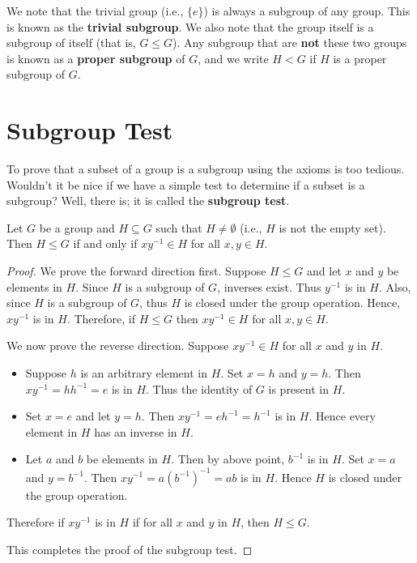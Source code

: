 We note that the trivial group (i.e., $\{e\}$) is always a subgroup of any group. This is known as the \textbf{trivial subgroup}. We also note that the group itself is a subgroup of itself (that is, $G \leq G$). Any subgroup that are \textbf{not} these two groups is known as a \textbf{proper subgroup} of $G$, and we write $H < G$ if $H$ is a proper subgroup of $G$.

\section{Subgroup Test}
To prove that a subset of a group is a subgroup using the axioms is too tedious. Wouldn't it be nice if we have a simple test to determine if a subset is a subgroup? Well, there is; it is called the \textbf{subgroup test}.
\begin{theorem}
    Let $G$ be a group and $H \subseteq G$ such that $H \neq \emptyset$ (i.e., $H$ is not the empty set). Then $H \leq G$ if and only if $xy^{-1} \in H$ for all $x, y \in H$.
\end{theorem}
\begin{proof}
    We prove the forward direction first. Suppose $H \leq G$ and let $x$ and $y$ be elements in $H$. Since $H$ is a subgroup of $G$, inverses exist. Thus $y^{-1}$ is in $H$. Also, since $H$ is a subgroup of $G$, thus $H$ is closed under the group operation. Hence, $xy^{-1}$ is in $H$. Therefore, if $H \leq G$ then $xy^{-1} \in H$ for all $x, y \in H$.

    We now prove the reverse direction. Suppose $xy^{-1}\in H$ for all $x$ and $y$ in $H$.
    \begin{itemize}
        \item Suppose $h$ is an arbitrary element in $H$. Set $x = h$ and $y = h$. Then $xy^{-1} = hh^{-1} = e$ is in $H$. Thus the identity of $G$ is present in $H$.
        \item Set $x = e$ and let $y = h$. Then $xy^{-1} = eh^{-1} = h^{-1}$ is in $H$. Hence every element in $H$ has an inverse in $H$.
        \item Let $a$ and $b$ be elements in $H$. Then by above point, $b^{-1}$ is in $H$. Set $x = a$ and $y = b^{-1}$. Then $xy^{-1} = a\left(b^{-1}\right)^{-1} = ab$ is in $H$. Hence $H$ is closed under the group operation.
    \end{itemize}
    Therefore if $xy^{-1}$ is in $H$ if for all $x$ and $y$ in $H$, then $H \leq G$.

    This completes the proof of the subgroup test.
\end{proof}

